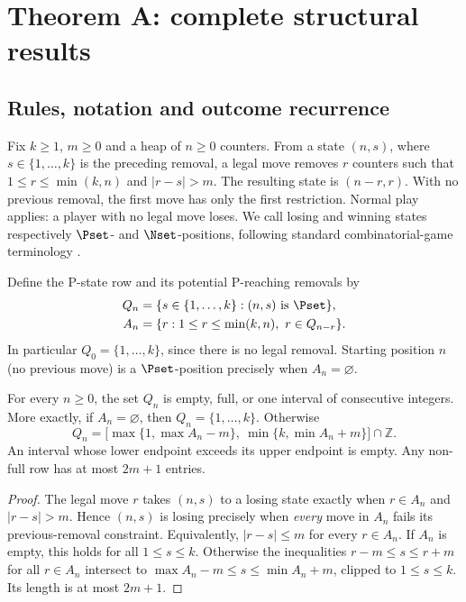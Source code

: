 \section{Theorem A: complete structural results}\label{sec:A}
\statusproved
\subsection{Rules, notation and outcome recurrence}
Fix $k\ge1$, $m\ge0$ and a heap of $n\ge0$ counters. From a state $(n,s)$, where $s\in\{1,\ldots,k\}$ is the preceding removal, a legal move removes $r$ counters such that $1\le r\le\min(k,n)$ and $|r-s|>m$. The resulting state is $(n-r,r)$. With no previous removal, the first move has only the first restriction. Normal play applies: a player with no legal move loses. We call losing and winning states respectively $\Pset$- and $\Nset$-positions, following standard combinatorial-game terminology \cite{sprague1935,grundy1939,winningways2001}.

Define the P-state row and its potential P-reaching removals by
\begin{align}
Q_n&=\{s\in\{1,\ldots,k\}:(n,s)\text{ is }\Pset\},\\
A_n&=\{r:1\le r\le\min(k,n),\ r\in Q_{n-r}\}.
\end{align}
In particular $Q_0=\{1,\ldots,k\}$, since there is no legal removal. Starting position $n$ (no previous move) is a $\Pset$-position precisely when $A_n=\varnothing$.

\begin{theorem}\label{thm:Ainterval}
For every $n\ge0$, the set $Q_n$ is empty, full, or one interval of consecutive integers. More exactly, if $A_n=\varnothing$, then $Q_n=\{1,\ldots,k\}$. Otherwise
\[
\boxed{Q_n=\bigl[\max\{1,\max A_n-m\},\ \min\{k,\min A_n+m\}\bigr]\cap\mathbb Z.}
\]
An interval whose lower endpoint exceeds its upper endpoint is empty. Any non-full row has at most $2m+1$ entries.
\end{theorem}
\begin{proof}
The legal move $r$ takes $(n,s)$ to a losing state exactly when $r\in A_n$ and $|r-s|>m$. Hence $(n,s)$ is losing precisely when \emph{every} move in $A_n$ fails its previous-removal constraint. Equivalently, $|r-s|\le m$ for every $r\in A_n$. If $A_n$ is empty, this holds for all $1\le s\le k$. Otherwise the inequalities $r-m\le s\le r+m$ for all $r\in A_n$ intersect to $\max A_n-m\le s\le\min A_n+m$, clipped to $1\le s\le k$. Its length is at most $2m+1$.
\end{proof}

